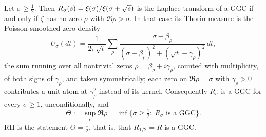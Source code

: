\begin{theorem}\label{rz:thm:threshold}
Let $\sigma\ge\frac12$. Then $R_\sigma(s)=\xi(\sigma)/\xi(\sigma+\sqrt{s})$ is the Laplace transform of a GGC if and only if $\zeta$ has no zero $\rho$ with $\Re\rho>\sigma$. In that case its Thorin measure is the Poisson smoothed zero density
\[
U_\sigma(dt)=\frac{1}{2\pi\sqrt t}\sum_\rho\frac{\sigma-\beta_\rho}{(\sigma-\beta_\rho)^2+(\sqrt t-\gamma_\rho)^2}\,dt,
\]
the sum running over all nontrivial zeros $\rho=\beta_\rho+i\gamma_\rho$, counted with multiplicity, of both signs of $\gamma_\rho$, and taken symmetrically; each zero on $\Re\rho=\sigma$ with $\gamma_\rho>0$ contributes a unit atom at $\gamma_\rho^2$ instead of its kernel. Consequently $R_\sigma$ is a GGC for every $\sigma\ge1$, unconditionally, and
\[
\Theta:=\sup_\rho\Re\rho=\inf\{\sigma\ge\tfrac12:\ R_\sigma\text{ is a GGC}\}.
\]
RH is the statement $\Theta=\frac12$, that is, that $R_{1/2}=R$ is a GGC.
\end{theorem}

